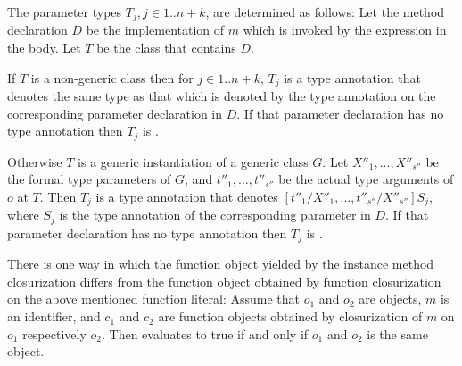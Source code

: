 \documentclass[makeidx]{article}
\begin{document}



\LMHash{}%
The parameter types $T_j, j \in 1 .. n+k$, are determined as follows:
Let the method declaration $D$ be the implementation of $m$ which is invoked by the expression in the body.
Let $T$ be the class that contains $D$.


\LMHash{}%
If $T$ is a non-generic class then for $j \in 1 .. n+k$,
$T_j$ is a type annotation that denotes the same type as that which is denoted by the type annotation on the corresponding parameter declaration in $D$.
If that parameter declaration has no type annotation then $T_j$ is \DYNAMIC{}.

\LMHash{}%
Otherwise $T$ is a generic instantiation of a generic class $G$.
Let $X''_1, \ldots, X''_{s''}$ be the formal type parameters of $G$,
and $t''_1, \ldots, t''_{s''}$ be the actual type arguments of $o$ at $T$.
Then $T_j$ is a type annotation that denotes $[t''_1/X''_1, \ldots, t''_{s''}/X''_{s''}]S_j$,
where $S_j$ is the type annotation of the corresponding parameter in $D$.
If that parameter declaration has no type annotation then $T_j$ is \DYNAMIC{}.

\LMHash{}%
There is one way in which
the function object yielded by the instance method closurization differs from
the function object obtained by function closurization on the above mentioned function literal:
Assume that $o_1$ and $o_2$ are objects, $m$ is an identifier,
and $c_1$ and $c_2$ are function objects
obtained by closurization of $m$ on $o_1$ respectively $o_2$.
Then  evaluates to true if and only if $o_1$ and $o_2$ is the same object.

\end{document}
